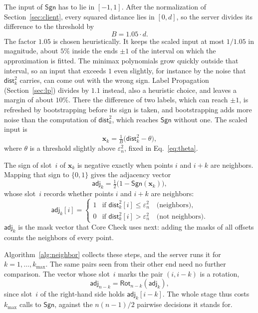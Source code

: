 The input of $\mathsf{Sgn}$ has to lie in $[-1,1]$. After the
normalization of Section~\ref{sec:client}, every squared distance lies
in $[0,d]$, so the server divides its difference to the threshold by
\begin{equation}
  \label{eq:bound}
  B = 1.05 \cdot d .
\end{equation}
The factor $1.05$ is chosen heuristically. It keeps the scaled input at
most $1/1.05$ in magnitude,
about $5\%$ inside the ends $\pm 1$ of the interval on which the
approximation is fitted. The minimax polynomials grow quickly outside
that interval, so an input that exceeds $1$ even slightly, for instance
by the noise that $\mathsf{dist}_k^{2}$ carries, can come out with the
wrong sign. Label Propagation (Section~\ref{sec:lp}) divides by $1.1$
instead, also a heuristic choice, and leaves a margin of about $10\%$. There the difference of two
labels, which can reach $\pm 1$, is refreshed by bootstrapping before its
sign is taken, and bootstrapping adds more noise than the computation of
$\mathsf{dist}_k^{2}$, which reaches $\mathsf{Sgn}$ without one. The
scaled input is
\begin{equation}
  \label{eq:cmpinput}
  \mathbf{x}_k = \tfrac{1}{B}
    \bigl( \mathsf{dist}_k^{2} - \theta \bigr),
\end{equation}
where $\theta$ is a threshold slightly above $\varepsilon_n^2$, fixed in
Eq.~\eqref{eq:theta}.

The sign of slot~$i$ of $\mathbf{x}_k$ is negative exactly when points
$i$ and $i+k$ are neighbors. Mapping that sign to $\{0,1\}$ gives the
adjacency vector
\begin{equation}
  \label{eq:adj}
  \mathsf{adj}_k = \tfrac{1}{2}
    \bigl( 1 - \mathsf{Sgn}(\mathbf{x}_k) \bigr),
\end{equation}
whose slot~$i$ records whether points $i$ and $i+k$ are neighbors:
\[
  \mathsf{adj}_k[i] =
  \begin{cases}
    1 & \text{if } \mathsf{dist}_k^{2}[i] \le \varepsilon_n^2
        \quad \text{(neighbors)}, \\[2pt]
    0 & \text{if } \mathsf{dist}_k^{2}[i] > \varepsilon_n^2
        \quad \text{(not neighbors)}.
  \end{cases}
\]
$\mathsf{adj}_k$ is the mask vector that Core Check uses next: adding
the masks of all offsets counts the neighbors of every point.

Algorithm~\ref{alg:neighbor} collects these steps, and the server runs
it for $k = 1, \dots, k_{\max}$. The same pairs seen from their other end
need no further comparison. The vector whose slot~$i$ marks the pair
$(i, i-k)$ is a rotation,
\[
  \mathsf{adj}_{n-k} = \mathsf{Rot}_{n-k}(\mathsf{adj}_{k}),
\]
since slot~$i$ of the right-hand side holds $\mathsf{adj}_k[i-k]$. The
whole stage thus costs $k_{\max}$ calls to $\mathsf{Sgn}$, against the
$n(n-1)/2$ pairwise decisions it stands for.

